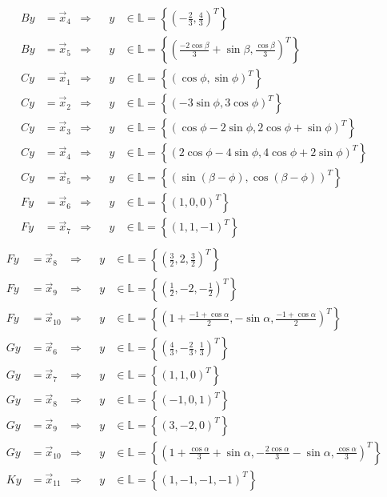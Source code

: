 \documentclass[11pt]{exam}
\begin{document}
\begin{questions}
\begin{solution}
\begin{align*}
		By&=\vec{x}_4&\Rightarrow&&y&\in\mathbb{L}=\left\{\left(-\frac{2}{3},\frac{4}{3}\right)^T\right\}\\
		By&=\vec{x}_5&\Rightarrow&&y&\in\mathbb{L}=\left\{\left(\frac{-2\cos\beta}{3}+\sin\beta,\frac{\cos\beta}{3}\right)^T\right\}\\
		Cy&=\vec{x}_1&\Rightarrow&&y&\in\mathbb{L}=\left\{(\cos\phi,\sin\phi)^T\right\}\\
		Cy&=\vec{x}_2&\Rightarrow&&y&\in\mathbb{L}=\left\{(-3\sin\phi,3\cos\phi)^T\right\}\\
		Cy&=\vec{x}_3&\Rightarrow&&y&\in\mathbb{L}=\left\{(\cos\phi-2\sin\phi,2\cos\phi+\sin\phi)^T\right\}\\
		Cy&=\vec{x}_4&\Rightarrow&&y&\in\mathbb{L}=\left\{(2\cos\phi-4\sin\phi,4\cos\phi+2\sin\phi)^T\right\}\\
		Cy&=\vec{x}_5&\Rightarrow&&y&\in\mathbb{L}=\left\{(\sin(\beta-\phi),\cos(\beta-\phi))^T\right\}\\
		Fy&=\vec{x}_6&\Rightarrow&&y&\in\mathbb{L}=\left\{(1,0,0)^T\right\}\\
		Fy&=\vec{x}_7&\Rightarrow&&y&\in\mathbb{L}=\left\{(1,1,-1)^T\right\}\\
	\end{align*}\begin{align*}
		Fy&=\vec{x}_8&\Rightarrow&&y&\in\mathbb{L}=\left\{\left(\frac{3}{2},2,\frac{3}{2}\right)^T\right\}\\
		Fy&=\vec{x}_9&\Rightarrow&&y&\in\mathbb{L}=\left\{\left(\frac{1}{2},-2,-\frac{1}{2}\right)^T\right\}\\
		Fy&=\vec{x}_{10}&\Rightarrow&&y&\in\mathbb{L}=\left\{\left(1+\frac{-1+\cos\alpha}{2},-\sin\alpha,\frac{-1+\cos\alpha}{2}\right)^T\right\}\\
		Gy&=\vec{x}_6&\Rightarrow&&y&\in\mathbb{L}=\left\{\left(\frac{4}{3},-\frac{2}{3},\frac{1}{3}\right)^T\right\}\\
		Gy&=\vec{x}_7&\Rightarrow&&y&\in\mathbb{L}=\left\{(1,1,0)^T\right\}\\
		Gy&=\vec{x}_8&\Rightarrow&&y&\in\mathbb{L}=\left\{(-1,0,1)^T\right\}\\
		Gy&=\vec{x}_9&\Rightarrow&&y&\in\mathbb{L}=\left\{(3,-2,0)^T\right\}\\
		Gy&=\vec{x}_{10}&\Rightarrow&&y&\in\mathbb{L}=\left\{\left(1+\frac{\cos\alpha}{3}+\sin\alpha,-\frac{2\cos\alpha}{3}-\sin\alpha,\frac{\cos\alpha}{3}\right)^T\right\}\\
		Ky&=\vec{x}_{11}&\Rightarrow&&y&\in\mathbb{L}=\left\{(1,-1,-1,-1)^T\right\}\\

\end{align*}
\end{solution}
\end{questions}
\end{document}
